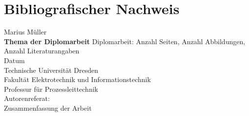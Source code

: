 \chapter*{Bibliografischer Nachweis}
\thispagestyle{empty}
Marius M\"uller\\[2ex]
\textbf{Thema der Diplomarbeit} \newline
Diplomarbeit: Anzahl Seiten, Anzahl Abbildungen, Anzahl Literaturangaben\\
Datum \\
Technische Universit\"at Dresden \\
Fakult\"at Elektrotechnik und Informationstechnik \\
Professur für Prozessleittechnik\\[2ex]
Autorenreferat:\\
Zusammenfassung der Arbeit

